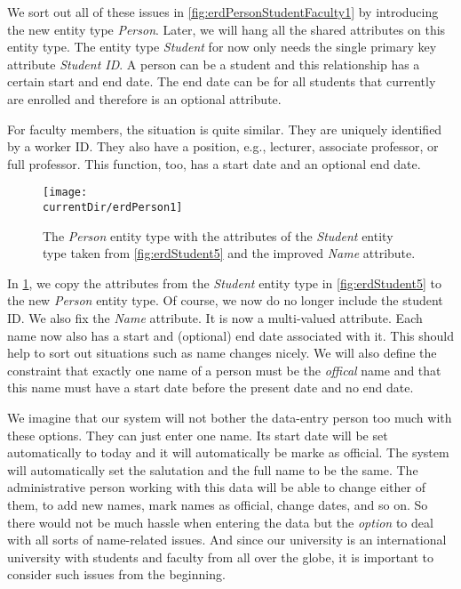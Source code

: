 We sort out all of these issues in \cref{fig:erdPersonStudentFaculty1} by introducing the new entity type \emph{Person}.
Later, we will hang all the shared attributes on this entity type.
The entity type \emph{Student} for now only needs the single primary key attribute \emph{Student ID}.
A person can be a student and this relationship has a certain start and end date.
The end date can be  for all students that currently are enrolled and therefore is an optional attribute.

For faculty members, the situation is quite similar.
They are uniquely identified by a worker ID.
They also have a position, e.g., lecturer, associate professor, or full professor.
This function, too, has a start date and an optional end date.

\begin{figure}%
\centering%
\texttt{[image: \\currentDir/erdPerson1]}%
\caption{The \emph{Person} entity type with the attributes of the \emph{Student} entity type taken from \cref{fig:erdStudent5} and the improved \emph{Name} attribute.}%
\label{fig:erdPerson1}%
\end{figure}%
%
In \cref{fig:erdPerson1}, we copy the attributes from the \emph{Student} entity type in \cref{fig:erdStudent5} to the new \emph{Person} entity type.
Of course, we now do no longer include the student ID.
We also fix the \emph{Name} attribute.
It is now a multi-valued attribute.
Each name now also has a start and (optional) end date associated with it.
This should help to sort out situations such as name changes nicely.
We will also define the constraint that exactly one name of a person must be the \emph{offical} name and that this name must have a start date before the present date and no end date.

We imagine that our system will not bother the data-entry person too much with these options.
They can just enter one name.
Its start date will be set automatically to today and it will automatically be marke as official.
The system will automatically set the salutation and the full name to be the same.
The administrative person working with this data will be able to change either of them, to add new names, mark names as official, change dates, and so on.
So there would not be much hassle when entering the data but the \emph{option} to deal with all sorts of name-related issues.
And since our university is an international university with students and faculty from all over the globe, it is important to consider such issues from the beginning.


